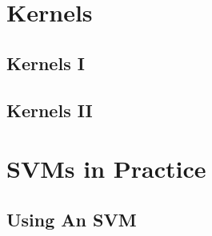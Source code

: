 \documentclass{article}
\begin{document}
\begin{CJK}{UTF8}{gbsn}
\section{Kernels}
\subsection{Kernels I}
\subsection{Kernels II}
\section{SVMs in Practice}
\subsection{Using An SVM}
\end{CJK}
\end{document}
